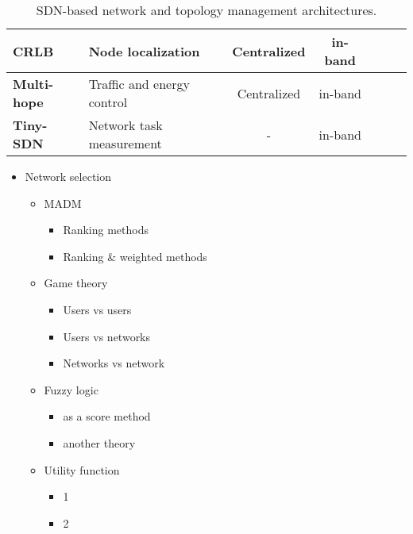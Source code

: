\begin{table}[h!]
\begin{tabulary}{\columnwidth}{L|L|C|C|C|C|C}
	\textbf{CRLB}                                    & Node localization                      & Centralized                       & in-band                  &                                       &                                       & \\\hline
	\textbf{Multi-hope}                              & Traffic and energy control             & Centralized                       & in-band                  &                                       &                                       & \ok                              \\\hline
	\textbf{Tiny-SDN}                                & Network task measurement               & -                                 & in-band                  &                                       &                                       & \\
	\end{tabulary}
	\caption{\label{tab:Tableuy} SDN-based network and topology management architectures. \cite{ndiaye_software_2017}}
\end{table}







\begin{itemize}
	\item Network selection
	\begin{itemize}
		\item MADM
		\begin{itemize}
			\item Ranking methods
			\item Ranking \& weighted methods
		\end{itemize}
		\item Game theory
		\begin{itemize}
			\item Users vs users
			\item Users vs networks
			\item Networks vs network
		\end{itemize}
		\item Fuzzy logic
		\begin{itemize}
			\item as a score method
			\item another theory
		\end{itemize}
		\item Utility function
		\begin{itemize}
			\item 1
			\item 2
		\end{itemize}
	\end{itemize}
\end{itemize}




